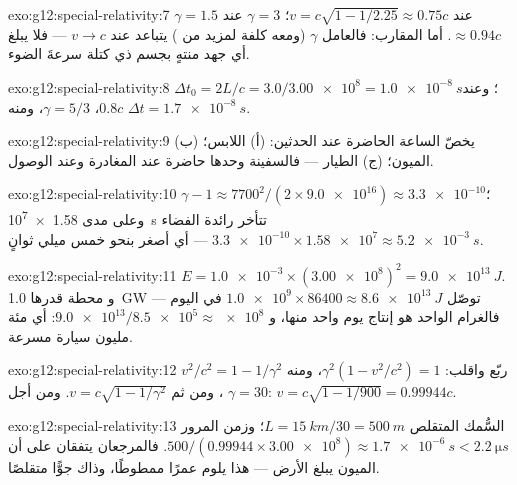 \begin{solution}{exo:g12:special-relativity:7}
$\gamma = 1.5$ عند $v = c\sqrt{1 - 1/2.25} \approx 0.75c$؛
$\gamma = 3$ عند $\approx 0.94c$. أما المقارب: فالعامل $\gamma$ (ومعه
كلفة  لمزيد من ) يتباعد عند $v \to c$ --- فلا يبلغ أي
جهد منتهٍ بجسم ذي كتلة سرعةَ الضوء.
\end{solution}

\begin{solution}{exo:g12:special-relativity:8}
$\Delta t_0 = 2L/c = 3.0/\num{3.00e8} = \qty{1.0e-8}{s}$؛ وعند $0.8c$،
$\gamma = 5/3$، ومنه $\Delta t = \qty{1.7e-8}{s}$.
\end{solution}

\begin{solution}{exo:g12:special-relativity:9}
 يخصّ الساعة الحاضرة عند الحدثين: (أ) اللابس؛
(ب) الميون؛ (ج) الطيار --- فالسفينة وحدها حاضرة عند
المغادرة وعند الوصول.
\end{solution}

\begin{solution}{exo:g12:special-relativity:10}
$\gamma - 1 \approx 7700^2/(2 \times \num{9.0e16}) \approx
\num{3.3e-10}$؛ وعلى مدى \qty{1.58e7}{s} تتأخر رائدة الفضاء
$\num{3.3e-10} \times \num{1.58e7} \approx \qty{5.2e-3}{s}$ --- أي أصغر بنحو
خمس ميلي ثوانٍ.
\end{solution}

\begin{solution}{exo:g12:special-relativity:11}
$E = \num{1.0e-3} \times (\num{3.00e8})^2 = \qty{9.0e13}{J}$. و
محطة قدرها \qty{1.0}{GW} توصّل $\num{1.0e9} \times 86400 \approx
\qty{8.6e13}{J}$ في اليوم --- فالغرام الواحد هو إنتاج يوم واحد منها، و
$\num{9.0e13}/\num{8.5e5} \approx \num{e8}$: أي مئة مليون
سيارة مسرعة.
\end{solution}

\begin{solution}{exo:g12:special-relativity:12}
ربّع واقلب: $\gamma^2(1 - v^2/c^2) = 1$، ومنه
$v^2/c^2 = 1 - 1/\gamma^2$، ومن ثم $v = c\sqrt{1 - 1/\gamma^2}$. ومن أجل
$\gamma = 30$: $v = c\sqrt{1 - 1/900} = 0.99944c$.
\end{solution}

\begin{solution}{exo:g12:special-relativity:13}
السُّمك المتقلص $L = \qty{15}{km}/30 = \qty{500}{m}$؛ وزمن المرور
$500/(0.99944 \times \num{3.00e8}) \approx \qty{1.7e-6}{s} <
\qty{2.2}{\micro s}$. فالمرجعان يتفقان على أن الميون يبلغ الأرض ---
هذا يلوم عمرًا ممطوطًا، وذاك جوًّا متقلصًا.
\end{solution}

